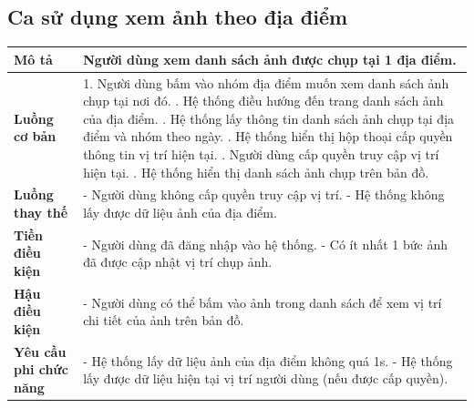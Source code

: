 \subsection{Ca sử dụng xem ảnh theo địa điểm}

\vspace{0.5cm}

\noindent 
\begin{tabularx}{\linewidth}{| l | X |} 
\hline 
\textbf{Mô tả} & Người dùng xem danh sách ảnh được chụp tại 1 địa điểm. \\
\hline 
\textbf{Luồng cơ bản} & 1. Người dùng bấm vào nhóm địa điểm muốn xem danh sách ảnh chụp tại nơi đó. \newline
                       2. Hệ thống điều hướng đến trang danh sách ảnh của địa điểm. \newline
                       3. Hệ thống lấy thông tin danh sách ảnh chụp tại địa điểm và nhóm theo ngày. \newline
                       4. Hệ thống hiển thị hộp thoại cấp quyền thông tin vị trí hiện tại. \newline
                       5. Người dùng cấp quyền truy cập vị trí hiện tại. \newline
                       6. Hệ thống hiển thị danh sách ảnh chụp trên bản đồ. \\
\hline
\textbf{Luồng thay thế} & - Người dùng không cấp quyền truy cập vị trí. \newline
                          - Hệ thống không lấy được dữ liệu ảnh của địa điểm. \\
\hline
\textbf{Tiền điều kiện} & - Người dùng đã đăng nhập vào hệ thống. \newline
                          - Có ít nhất 1 bức ảnh đã được cập nhật vị trí chụp ảnh. \\
\hline
\textbf{Hậu điều kiện} & - Người dùng có thể bấm vào ảnh trong danh sách để xem vị trí chi tiết của ảnh trên bản đồ. \\
\hline 
\textbf{Yêu cầu phi chức năng} & - Hệ thống lấy dữ liệu ảnh của địa điểm không quá 1s. \newline
                           - Hệ thống lấy được dữ liệu hiện tại vị trí người dùng (nếu được cấp quyền). \\
\hline 
\end{tabularx}

\vspace{0.8cm}

